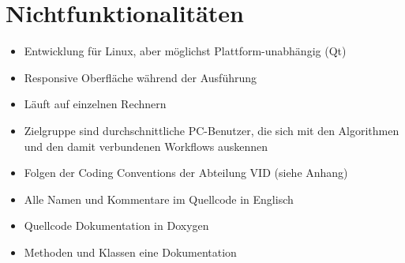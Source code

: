 \section{Nichtfunktionalitäten}
		\begin{itemize} 
			\item Entwicklung für Linux, aber möglichst Plattform-unabhängig (Qt)
			\item Responsive Oberfläche während der Ausführung
			\item Läuft auf einzelnen Rechnern
			\item Zielgruppe sind durchschnittliche PC-Benutzer, die sich mit den Algorithmen und den damit verbundenen Workflows auskennen
			\item Folgen der Coding Conventions der Abteilung VID (siehe Anhang)
			\item Alle Namen und Kommentare im Quellcode in Englisch
			\item Quellcode Dokumentation in Doxygen
			\item Methoden und Klassen eine Dokumentation
		\end{itemize}